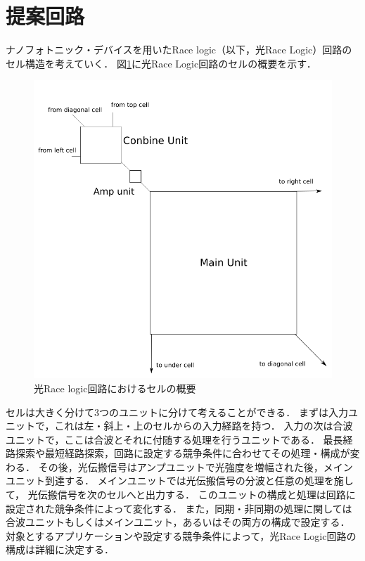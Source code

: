 \section{提案回路}
ナノフォトニック・デバイスを用いたRace logic（以下，光Race Logic）回路のセル構造を考えていく．
図\ref{fig:lightracelogiccell}に光Race Logic回路のセルの概要を示す．
\begin{figure}[t!]
\begin{center}
\includegraphics[keepaspectratio,scale=0.5]{fig/3/lightracelogic_cell_1.png}
\caption{光Race logic回路におけるセルの概要}
\label{fig:lightracelogiccell}
\end{center}
\end{figure}

セルは大きく分けて3つのユニットに分けて考えることができる．
まずは入力ユニットで，これは左・斜上・上のセルからの入力経路を持つ．
入力の次は合波ユニットで，ここは合波とそれに付随する処理を行うユニットである．
最長経路探索や最短経路探索，回路に設定する競争条件に合わせてその処理・構成が変わる．
その後，光伝搬信号はアンプユニットで光強度を増幅された後，メインユニット到達する．
メインユニットでは光伝搬信号の分波と任意の処理を施して，
光伝搬信号を次のセルへと出力する．
このユニットの構成と処理は回路に設定された競争条件によって変化する．
また，同期・非同期の処理に関しては合波ユニットもしくはメインユニット，あるいはその両方の構成で設定する．
対象とするアプリケーションや設定する競争条件によって，光Race Logic回路の構成は詳細に決定する．

